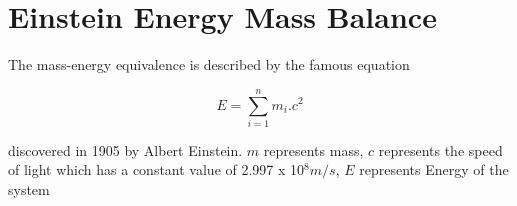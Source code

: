 
\section{Einstein Energy Mass Balance}
The mass-energy equivalence is described by the famous equation

\[E=\sum_{i=1}^{n} m_i .c^2\]

discovered in 1905 by Albert Einstein. 
\vspace{1em}
\newline 
$m$ represents mass, $c$ represents the speed of light which has a constant value of 2.997 x 10$^8 m/s$, $E$ represents Energy of the system

